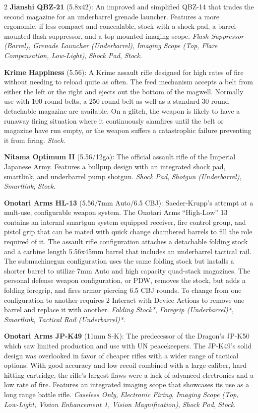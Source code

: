 \documentclass[
  oneside]{article}
\begin{document}
\begin{multicols}{2}
\textbf{Jianshi QBZ-21} (5.8x42): An improved and
simplified QBZ-14 that trades the second magazine
for an underbarrel grenade launcher. Features a
more ergonomic, if less compact and concealable,
stock with a shock pad, a barrel-mounted flash
suppressor, and a top-mounted imaging scope.
\emph{Flash Suppressor (Barrel)}, \emph{Grenade
Launcher (Underbarrel)}, \emph{Imaging Scope (Top,
Flare Compensation, Low-Light)}, \emph{Shock Pad},
\emph{Stock}.

\textbf{Krime Happiness} (5.56): A Krime assault
rifle designed for high rates of fire without
needing to reload quite as often. The feed
mechanism accepts a belt from either the left or
the right and ejects out the bottom of the
magwell. Normally use with 100 round belts, a 250
round belt as well as a standard 30 round
detachable magazine are available. On a glitch,
the weapon is likely to have a runaway firing
situation where it continuously slamfires until
the belt or magazine have run empty, or the weapon
suffers a catastrophic failure preventing it from
firing. \emph{Stock}.

\textbf{Nitama Optimum II} (5.56/12ga): The
official assault rifle of the Imperial Japanese
Army. Features a bullpup design with an integrated
shock pad, smartlink, and underbarrel pump
shotgun. \emph{Shock Pad}, \emph{Shotgun
(Underbarrel)}, \emph{Smartlink}, \emph{Stock}.

\textbf{Onotari Arms HL-13} (5.56/7mm Auto/6.5
CBJ): Saeder-Krupp's attempt at a mult-use,
configurable weapon system. The Onotari Arms
``High-Low'' 13 contains an internal smartgun
system equipped receiver, fire control group, and
pistol grip that can be mated with quick change
chambered barrels to fill the role required of it.
The assault rifle configuration attaches a
detachable folding stock and a carbine length
5.56x45mm barrel that includes an underbarrel
tactical rail. The submachinegun configuration
uses the same folding stock but installs a shorter
barrel to utilize 7mm Auto and high capacity
quad-stack magazines. The personal defense weapon
configuration, or PDW, removes the stock, but adds
a folding foregrip, and fires armor piercing 6.5
CBJ rounds. To change from one configuration to
another requires 2 Interact with Device Actions to
remove one barrel and replace it with another.
\emph{Folding Stock*}, \emph{Foregrip
(Underbarrel)*}, \emph{Smartlink}, \emph{Tactical
Rail (Underbarrel)*}.

\textbf{Onotari Arms JP-K49} (11mm S-K): The
predecessor of the Dragon's JP-K50 which saw
limited production and use with UN peacekeepers.
The JP-K49's solid design was overlooked in favor
of cheaper rifles with a wider range of tactical
options. With good accuracy and low recoil
combined with a large caliber, hard hitting
cartridge, the rifle's largest flaws were a lack
of advanced electronics and a low rate of fire.
Features an integrated imaging scope that
showcases its use as a long range battle rifle.
\emph{Caseless Only}, \emph{Electronic Firing},
\emph{Imaging Scope (Top, Low-Light, Vision
Enhancement 1, Vision Magnification)}, \emph{Shock
Pad}, \emph{Stock}.


\end{multicols}
\end{document}

